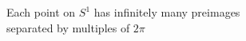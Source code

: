 \documentclass[preview]{standalone}
\begin{document}
\begin{center}
Each point on $S^1$ has infinitely many preimages\\separated by multiples of $2\pi$
\end{center}
\end{document}
